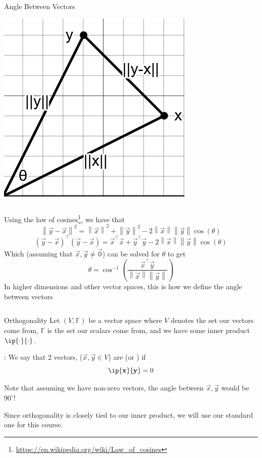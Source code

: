\documentclass[xcoler=dvipsnames, aspectratio=169]{beamer}
\newcommand{\F}{\mathbb{F}}
\newcommand{\norm}[1]{\left\|#1\right\|}
\begin{document}
    \begin{frame}{Angle Between Vectors}
        \small
        \begin{center}
            \includegraphics[width=.15\textwidth]{images/lawOfCosines2.png}
        \end{center}
        \pause
        \begin{columns}
            Using the law of cosines\footnote{\url{https://en.wikipedia.org/wiki/Law\_of\_cosines}},
            we have that 
            \[
                \norm{\vec{y}-\vec{x}}^2 = \norm{\vec{x}}^2 + \norm{\vec{y}}^2 
                -2\norm{\vec{x}}\norm{\vec{y}}\cos(\theta)
            \]\pause
            \vspace{-10pt}
            \[
                (\vec{y}-\vec{x})^\top(\vec{y} - \vec{x}) = \vec{x}^\top\vec{x} + \vec{y}^\top\vec{y}
                - 2\norm{\vec{x}}\norm{\vec{y}}\cos(\theta)
            \]\pause
            Which (assuming that $\vec{x},\vec{y}\neq\vec{0}$) can be solved for $\theta$ to get
            \[
                \theta = \cos^{-1}\left(\frac{\vec{x}^\top\vec{y}}{\norm{\vec{x}}\norm{\vec{y}}}\right)
            \]\pause
            In higher dimensions and other vector spaces, this is how we define the angle between vectors
        \end{columns}
    \end{frame}
    \begin{frame}{Orthogonality}
        Let $(V,\F)$ be a vector space where $V$ denotes the set our vectors come from, $\F$ is the
        set our scalars come from, and we have some inner product $\ip{\cdot}{\cdot}$.
        \begin{defn}
            : We say that 2 vectors, 
            ($\vec{x},\vec{y}\in V$) are  (or ) if
            \[
                \ip{\vec{x}}{\vec{y}} = 0
            \]\pause
        \end{defn}
        Note that assuming we have non-zero vectors, the angle between $\vec{x},\vec{y}$ 
        would be $90^\circ$!\pause
        \begin{tcolorbox}
            Since orthogonality is closely tied to our inner product, we will use our standard one
            for this course.
        \end{tcolorbox}
    \end{frame}
\end{document}
